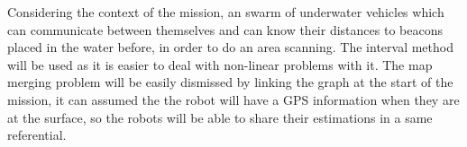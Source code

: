 Considering the context of the mission, an swarm of underwater vehicles which can communicate between themselves and can know their distances to beacons placed in the water before, in order to do an area scanning. The interval method will be used as it is easier to deal with non-linear problems with it. The map merging problem will be easily dismissed by linking the graph at the start of the mission, it can assumed the the robot will have a GPS information when they are at the surface, so the robots will be able to share their estimations in a same referential.